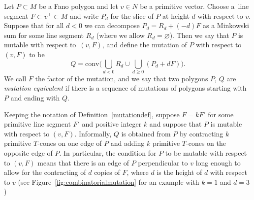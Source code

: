 	\begin{Definition}\label{mutationdef}
		Let $P \subset M$ be a Fano polygon and let $v \in N$ be a primitive vector. Choose a~line segment $F \subset v^{\perp} \subset M$ and write $P_d$
		for the slice of $P$ at height $d$ with respect to $v$. Suppose that for all $d<0$ we can decompose $P_d=R_d+(-d)F$ as a Minkowski sum for
		some line segment $R_d$ (where we allow $R_d =\varnothing$).
		Then we say that $P$ is mutable with respect to~$(v, F)$, and define the mutation of $P$ with respect to $(v, F)$ to be
		\[
		Q=\text{conv} \biggl( \bigcup_{d<0} R_d \cup \bigcup_{d\geq 0}(P_d+dF) \biggr).
		\]
		We call $F$ the factor of the mutation, and we say that two polygons $P$, $Q$ are {\it mutation equivalent} if there is a sequence of mutations
		of polygons starting with $P$ and ending with $Q$.
	\end{Definition}
	Keeping the notation of Definition~\ref{mutationdef}, suppose $F=kF'$ for some primitive line segment $F'$ and positive integer $k$ and suppose
	that $P$ is mutable with respect to $(v, F)$. Informally, $Q$ is obtained from $P$ by contracting $k$ primitive $T$-cones on one edge of $P$ and adding $k$
	primitive $T$-cones on the opposite edge of $P$.
	In particular, the condition for $P$ to be mutable with respect to $(v, F)$ means that there is an edge of $P$ perpendicular to $v$
	long enough to allow for the contracting of $d$ copies of $F$, where $d$ is the height of $d$ with respect to $v$ (see Figure~\ref{fig:combinatorialmutation} for an example with $k=1$ and $d=3$)
